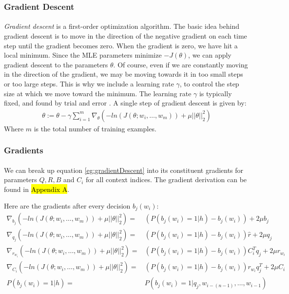 \documentclass[12pt]{ociamthesis}  %
\begin{document}
\subsubsection{Gradient Descent}
\paragraph{}
\emph{Gradient descent} is a first-order optimization algorithm. The basic idea behind gradient descent is to move in the direction of the negative gradient on each time step until the gradient becomes zero. When the gradient is zero, we have hit a local minimum. Since the MLE parameters minimize $-J(\theta)$, we can apply gradient descent to the parameters $\theta$. Of course, even if we are constantly moving in the direction of the gradient, we may be moving towards it in too small steps or too large steps. This is why we include a learning rate $\gamma$, to control the step size at which we move toward the minimum. The learning rate $\gamma$ is typically fixed, and found by trial and error \cite{Elkan2013}.
A single step of gradient descent is given by:
\begin{align}
\theta := \theta - \gamma \sum_{i=1}^{m} \nabla_\theta \left( -ln(J(\theta;w_i,\dots, w_m)) +  \mu ||\theta||^2_2 \right) \label{eg:gradientDescent} 
\end{align}
Where $m$ is the total number of training examples.

\subsubsection{Gradients}
\paragraph{}
We can break up equation \ref{eg:gradientDescent} into its constituent gradients for parameters $Q,R,B$ and $C_i$ for all context indices. The gradient derivation can be found in \hl{Appendix A}.

Here are the gradients after every decision $b_j(w_i)$:
\begin{align}
\nabla_{b_j} \left( -ln(J(\theta;w_i,\dots, w_m)) +  \mu ||\theta||^2_2 \right)  = &  \left( P \left(b_j(w_i) = 1 | h \right) - b_j(w_i) \right) +2\mu b_j  \label{eq:gradients}
\\
\nabla_{q_j} \left( -ln(J(\theta;w_i,\dots, w_m)) +  \mu ||\theta||^2_2 \right)  = &\left( P \left(b_j(w_i) = 1 | h \right) - b_j(w_i) \right)\hat{r} +2\mu q_j \nonumber
\\
\nabla_{r_{w_i}} \left( -ln(J(\theta;w_i,\dots, w_m)) +  \mu ||\theta||^2_2 \right)  = & \left( P \left(b_j(w_i) = 1 | h \right) - b_j(w_i)\right) C_i^T q_j   +2\mu r_{w_i} \nonumber
\\
\nabla_{C_i} \left( -ln(J(\theta;w_i,\dots, w_m)) +  \mu ||\theta||^2_2 \right)  = &\left( P \left(b_j(w_i) = 1 | h \right) - b_j(w_i) \right) r_{w_i}q_j^T  +2\mu C_i \nonumber
\\
P \left(b_j(w_i) = 1 | h \right)= & P \left(b_j(w_i) = 1 | q_j, w_{i-(n-1)},\dots, w_{i-1} \right) \nonumber
\end{align}
\end{document}
